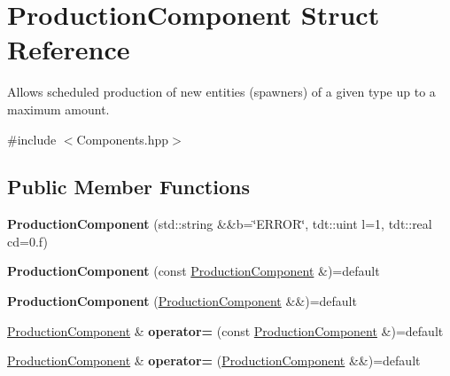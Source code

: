 \hypertarget{struct_production_component}{}\section{Production\+Component Struct Reference}
\label{struct_production_component}


Allows scheduled production of new entities (spawners) of a given type up to a maximum amount.  




{\ttfamily \#include $<$Components.\+hpp$>$}

\subsection*{Public Member Functions}
\begin{DoxyCompactItemize}
\item 
{\bfseries Production\+Component} (std\+::string \&\&b=\char`\"{}E\+R\+R\+OR\char`\"{}, tdt\+::uint l=1, tdt\+::real cd=0.f)\hypertarget{struct_production_component_ac016ba62c862a7e0afed63bbc5980614}{}\label{struct_production_component_ac016ba62c862a7e0afed63bbc5980614}

\item 
{\bfseries Production\+Component} (const \hyperlink{struct_production_component}{Production\+Component} \&)=default\hypertarget{struct_production_component_ae7f2dc96fcc114cfa1c8315baa4943b3}{}\label{struct_production_component_ae7f2dc96fcc114cfa1c8315baa4943b3}

\item 
{\bfseries Production\+Component} (\hyperlink{struct_production_component}{Production\+Component} \&\&)=default\hypertarget{struct_production_component_abb4436011d2a4bd61d9a0671b33987d1}{}\label{struct_production_component_abb4436011d2a4bd61d9a0671b33987d1}

\item 
\hyperlink{struct_production_component}{Production\+Component} \& {\bfseries operator=} (const \hyperlink{struct_production_component}{Production\+Component} \&)=default\hypertarget{struct_production_component_a6568dff88a6c69b22b581e7eb7400a4f}{}\label{struct_production_component_a6568dff88a6c69b22b581e7eb7400a4f}

\item 
\hyperlink{struct_production_component}{Production\+Component} \& {\bfseries operator=} (\hyperlink{struct_production_component}{Production\+Component} \&\&)=default\hypertarget{struct_production_component_ae06df6fe33cead3950ea5e641f38199b}{}\label{struct_production_component_ae06df6fe33cead3950ea5e641f38199b}

\end{DoxyCompactItemize}
